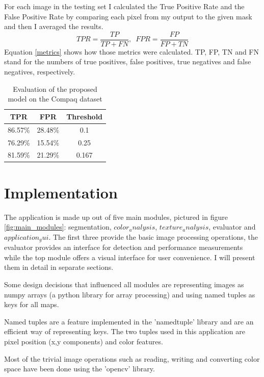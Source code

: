 \documentclass[12pt]{report}
\begin{document}
	For each image in the testing set I calculated the True Positive Rate and the False Positive Rate by comparing each pixel from my output to the given mask and then I averaged the results.
	\begin{equation}
	\label{metrics}
	TPR = \frac{TP}{TP + FN}, \,\,\, FPR = \frac{FP}{FP + TN}
	\end{equation}
	Equation \ref{metrics} shows how those metrics were calculated. TP, FP, TN and FN stand for the numbers of true positives, false positives, true negatives and false negatives, respectively.
	
	\begin{table}[h!]
		\begin{center}
			\caption{Evaluation of the proposed model on the Compaq dataset}
			\label{tab:results}
			\begin{tabular}{c|c|c}
				\textbf{TPR} & \textbf{FPR} & \textbf{Threshold}\\
				\hline
				86.57\% & 28.48\% & 0.1\\
				76.29\% & 15.54\% & 0.25\\
				81.59\% & 21.29\% & 0.167\\
			\end{tabular}
		\end{center}
	\end{table}
	
	\section{Implementation}
	The application is made up out of five main modules, pictured in figure \ref{fig:main_modules}: segmentation, $color_analysis$, $texture_analysis$, evaluator and $application_gui$. The first three provide the basic image processing operations, the evaluator provides an interface for detection and performance measurements while the top module offers a visual interface for user convenience. I will present them in detail in separate sections.
	
	Some design decisions that influenced all modules are representing images as numpy arrays (a python library for array processing) and using named tuples as keys for all maps. 
	
	Named tuples are a feature implemented in the 'namedtuple' library and are an efficient way of representing keys. The two tuples used in this application are pixel position (x,y components) and color features.
	
	Most of the trivial image operations such as reading, writing and converting color space have been done using the 'opencv' library.
	
\end{document}
